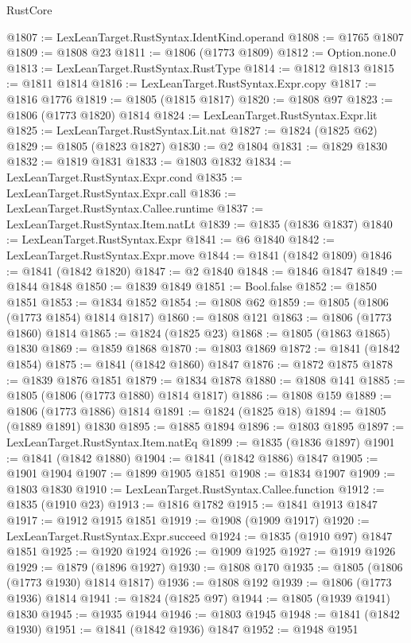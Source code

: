 \begin{lexlean}{RustCore}
\begin{coremodule}
@1807 := LexLeanTarget.RustSyntax.IdentKind.operand
@1808 := @1765 @1807
@1809 := @1808 @23
@1811 := @1806 (@1773 @1809)
@1812 := Option.none.{0}
@1813 := LexLeanTarget.RustSyntax.RustType
@1814 := @1812 @1813
@1815 := @1811 @1814
@1816 := LexLeanTarget.RustSyntax.Expr.copy
@1817 := @1816 @1776
@1819 := @1805 (@1815 @1817)
@1820 := @1808 @97
@1823 := @1806 (@1773 @1820) @1814
@1824 := LexLeanTarget.RustSyntax.Expr.lit
@1825 := LexLeanTarget.RustSyntax.Lit.nat
@1827 := @1824 (@1825 @62)
@1829 := @1805 (@1823 @1827)
@1830 := @2 @1804
@1831 := @1829 @1830
@1832 := @1819 @1831
@1833 := @1803 @1832
@1834 := LexLeanTarget.RustSyntax.Expr.cond
@1835 := LexLeanTarget.RustSyntax.Expr.call
@1836 := LexLeanTarget.RustSyntax.Callee.runtime
@1837 := LexLeanTarget.RustSyntax.Item.natLt
@1839 := @1835 (@1836 @1837)
@1840 := LexLeanTarget.RustSyntax.Expr
@1841 := @6 @1840
@1842 := LexLeanTarget.RustSyntax.Expr.move
@1844 := @1841 (@1842 @1809)
@1846 := @1841 (@1842 @1820)
@1847 := @2 @1840
@1848 := @1846 @1847
@1849 := @1844 @1848
@1850 := @1839 @1849
@1851 := Bool.false
@1852 := @1850 @1851
@1853 := @1834 @1852
@1854 := @1808 @62
@1859 := @1805 (@1806 (@1773 @1854) @1814 @1817)
@1860 := @1808 @121
@1863 := @1806 (@1773 @1860) @1814
@1865 := @1824 (@1825 @23)
@1868 := @1805 (@1863 @1865) @1830
@1869 := @1859 @1868
@1870 := @1803 @1869
@1872 := @1841 (@1842 @1854)
@1875 := @1841 (@1842 @1860) @1847
@1876 := @1872 @1875
@1878 := @1839 @1876 @1851
@1879 := @1834 @1878
@1880 := @1808 @141
@1885 := @1805 (@1806 (@1773 @1880) @1814 @1817)
@1886 := @1808 @159
@1889 := @1806 (@1773 @1886) @1814
@1891 := @1824 (@1825 @18)
@1894 := @1805 (@1889 @1891) @1830
@1895 := @1885 @1894
@1896 := @1803 @1895
@1897 := LexLeanTarget.RustSyntax.Item.natEq
@1899 := @1835 (@1836 @1897)
@1901 := @1841 (@1842 @1880)
@1904 := @1841 (@1842 @1886) @1847
@1905 := @1901 @1904
@1907 := @1899 @1905 @1851
@1908 := @1834 @1907
@1909 := @1803 @1830
@1910 := LexLeanTarget.RustSyntax.Callee.function
@1912 := @1835 (@1910 @23)
@1913 := @1816 @1782
@1915 := @1841 @1913 @1847
@1917 := @1912 @1915 @1851
@1919 := @1908 (@1909 @1917)
@1920 := LexLeanTarget.RustSyntax.Expr.succeed
@1924 := @1835 (@1910 @97) @1847 @1851
@1925 := @1920 @1924
@1926 := @1909 @1925
@1927 := @1919 @1926
@1929 := @1879 (@1896 @1927)
@1930 := @1808 @170
@1935 := @1805 (@1806 (@1773 @1930) @1814 @1817)
@1936 := @1808 @192
@1939 := @1806 (@1773 @1936) @1814
@1941 := @1824 (@1825 @97)
@1944 := @1805 (@1939 @1941) @1830
@1945 := @1935 @1944
@1946 := @1803 @1945
@1948 := @1841 (@1842 @1930)
@1951 := @1841 (@1842 @1936) @1847
@1952 := @1948 @1951

\end{coremodule}
\end{lexlean}
